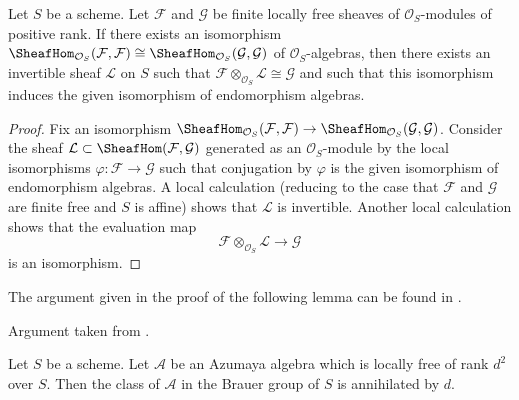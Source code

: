 \begin{lemma}
\label{lemma-end-unique-up-to-invertible}
Let $S$ be a scheme. Let $\mathcal{F}$ and $\mathcal{G}$ be finite locally
free sheaves of $\mathcal{O}_S$-modules of positive rank. If there
exists an isomorphism
$\SheafHom_{\mathcal{O}_S}(\mathcal{F}, \mathcal{F}) \cong
\SheafHom_{\mathcal{O}_S}(\mathcal{G}, \mathcal{G})$ of
$\mathcal{O}_S$-algebras, then there exists an invertible sheaf
$\mathcal{L}$ on $S$ such that
$\mathcal{F} \otimes_{\mathcal{O}_S} \mathcal{L} \cong \mathcal{G}$
and such that this isomorphism induces the given isomorphism of
endomorphism algebras.
\end{lemma}

\begin{proof}
Fix an isomorphism
$\SheafHom_{\mathcal{O}_S}(\mathcal{F}, \mathcal{F}) \to
\SheafHom_{\mathcal{O}_S}(\mathcal{G}, \mathcal{G})$.
Consider the sheaf $\mathcal{L} \subset \SheafHom(\mathcal{F}, \mathcal{G})$
generated as an $\mathcal{O}_S$-module by the local isomorphisms
$\varphi : \mathcal{F} \to \mathcal{G}$ such that conjugation by
$\varphi$ is the given isomorphism of endomorphism algebras.
A local calculation (reducing to the case that $\mathcal{F}$ and $\mathcal{G}$
are finite free and $S$ is affine) shows that $\mathcal{L}$ is invertible.
Another local calculation shows that the evaluation map
$$
\mathcal{F} \otimes_{\mathcal{O}_S} \mathcal{L} \longrightarrow \mathcal{G}
$$
is an isomorphism.
\end{proof}

\noindent
The argument given in the proof of the following lemma can be found in
\cite{Saltman-torsion}.

\begin{lemma}
\label{lemma-annihilated-by-degree}
\begin{reference}
Argument taken from \cite{Saltman-torsion}.
\end{reference}
Let $S$ be a scheme. Let $\mathcal{A}$ be an Azumaya algebra which is
locally free of rank $d^2$ over $S$. Then the class
of $\mathcal{A}$ in the Brauer group of $S$ is annihilated by $d$.
\end{lemma}

